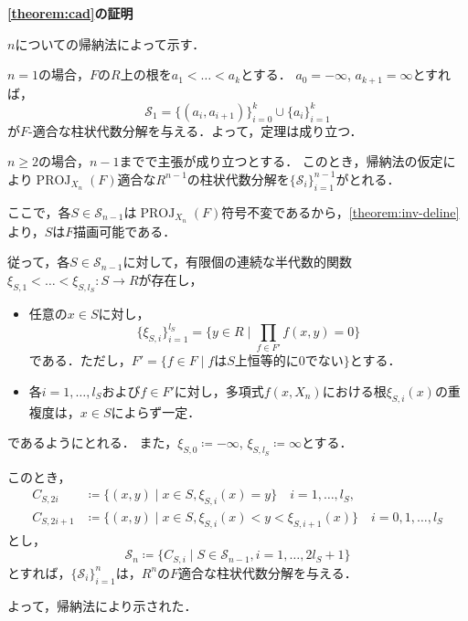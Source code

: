 \documentclass[uplatex, dvipdfmx]{jsarticle}
\makeatletter
\numberwithin{equation}{section}
\renewenvironment{proof}[1][\proofname]{\par
  \pushQED{\qed}%
  \normalfont \topsep6\p@\@plus6\p@\relax
  \trivlist
  \item\relax
  {\bfseries
  #1\@addpunct{.}}\hspace\labelsep\ignorespaces
}{
  \popQED\endtrivlist\@endpefalse
}
\newcommand{\map}[3]{{#1}\colon{#2}\rightarrow{#3}}
\DeclareMathOperator{\PROJ}{PROJ}
\theoremstyle{definition}
\renewcommand{\proofname}{\textbf{証明}}
\makeatother
\begin{document}
\begin{proof}[\cref{theorem:cad}の証明]
     $n$についての帰納法によって示す．

     $n=1$の場合，$F$の$R$上の根を$a_1 < \dots < a_k$とする．
     $a_0 = -\infty$, $a_{k+1} = \infty$とすれば，
     \begin{equation}
          \mathcal{S}_1 = \{(a_i, a_{i+1})\}_{i=0}^k \cup \{a_i\}_{i=1}^k
     \end{equation}
     が$F$-適合な柱状代数分解を与える．よって，定理は成り立つ．

     $n\geq 2$の場合，$n-1$までで主張が成り立つとする．
     このとき，帰納法の仮定により$\PROJ_{X_n}(F)$適合な$R^{n-1}$の柱状代数分解を$\{\mathcal{S}_i\}_{i=1}^{n-1}$がとれる．

     ここで，各$S \in \mathcal{S}_{n-1}$は$\PROJ_{X_n}(F)$符号不変であるから，\cref{theorem:inv-deline}より，$S$は$F$描画可能である．

     従って，各$S \in \mathcal{S}_{n-1}$に対して，有限個の連続な半代数的関数$\map{\xi_{S,1}< \dots < \xi_{S,l_S}}{S}{R}$が存在し，
     \begin{itemize}
          \item 任意の$ x \in S $に対し，
          \begin{equation}
               \{\xi_{S,i}\}_{i=1}^{l_S} = \{y \in R \mid \prod_{f \in F'}f(x,y)=0\}
          \end{equation}
          である．ただし，$F' = \{f \in F \mid \text{$f$は$S$上恒等的に0でない}\}$とする．
          \item 各$i=1, \dots, l_S$および$f \in F'$に対し，多項式$f(x,X_n)$における根$\xi_{S,i}(x)$の重複度は，$x\in S$によらず一定．
     \end{itemize}
     であるようにとれる．
     また，$\xi_{S,0} \coloneqq -\infty$, $\xi_{S,l_S} \coloneqq \infty$とする．

     このとき，
     \begin{align}
          C_{S,2i} &\coloneqq \{(x,y) \mid  x \in S, \xi_{S,i}(x) = y \} \quad i = 1,\dots, l_S,\\
          C_{S,2i+1} &\coloneqq \{(x,y) \mid x \in S, \xi_{S,i}(x)<y<\xi_{S,i+1}(x) \} \quad i = 0,1, \dots, l_S 
     \end{align}
     とし，
     \begin{equation}
          \mathcal{S}_n \coloneqq \{C_{S,i} \mid S \in \mathcal{S}_{n-1}, i=1, \dots, 2l_S+1\}
     \end{equation}
     とすれば，$\{\mathcal{S}_i\}_{i=1}^n$は，$R^n$の$F$適合な柱状代数分解を与える．

     よって，帰納法により示された．
\end{proof}
\end{document}
